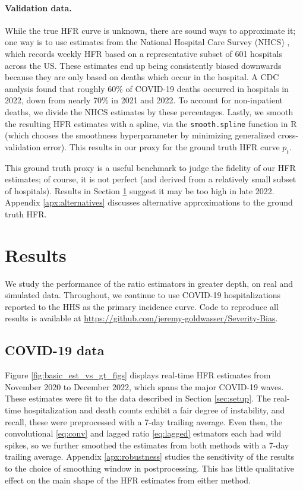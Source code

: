 \documentclass{article}
\begin{document}
\paragraph{Validation data.}

While the true HFR curve is unknown, there are sound ways to approximate it; one  
way is to use estimates from the National Hospital Care Survey (NHCS)
\citep{NHCS2023}, which records weekly HFR based on a representative subset 
of 601 hospitals across the US. These estimates end up being consistently
biased downwards because they are only based on deaths which occur in the
hospital. A CDC analysis \citep{ahmad2023covid} found that roughly 60\% of
COVID-19 deaths occurred in hospitals in 2022, down from nearly 70\% in 2021 and
2022. To account for non-inpatient deaths, we divide the NHCS estimates by these
percentages. Lastly, we smooth the resulting HFR estimates with a spline, via
the \texttt{smooth.spline} function in R (which chooses the smoothness
hyperparameter by minimizing generalized cross-validation error). This results 
in our proxy for the ground truth HFR curve $p_t$.  

This ground truth proxy is a useful benchmark to judge the fidelity of our HFR
estimates; of course, it is not perfect (and derived from a relatively small
subset of hospitals). Results in Section \ref{sec:results} suggest it may be too
high in late 2022. Appendix \ref{apx:alternatives} discusses alternative
approximations to the ground truth HFR.    

\section{Results}
\label{sec:results}

We study the performance of the ratio estimators in greater depth, on real and 
simulated data. Throughout, we continue to use COVID-19 hospitalizations
reported to the HHS as the primary incidence curve. Code to reproduce all
results is available at
\url{https://github.com/jeremy-goldwasser/Severity-Bias}.            

\subsection{COVID-19 data}
\label{sec:results_real}

Figure \ref{fig:basic_est_vs_gt_figs} displays real-time HFR estimates from
November 2020 to December 2022, which spans the major COVID-19 waves. These
estimates were fit to the data described in Section \ref{sec:setup}. The
real-time hospitalization and death counts exhibit a fair degree of instability,
and recall, these were preprocessed with a 7-day trailing average. Even then,
the convolutional \eqref{eq:conv} and lagged ratio \eqref{eq:lagged} estmators
each had wild spikes, so we further smoothed the estimates from both methods
with a 7-day trailing average. Appendix \ref{apx:robustness} studies the
sensitivity of the results to the choice of smoothing window in postprocessing.
This has little qualitative effect on the main shape of the HFR estimates from
either method.    
\end{document}

